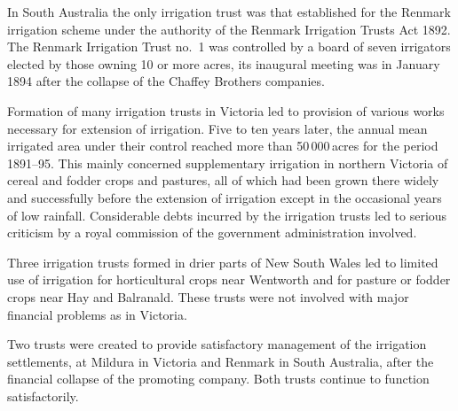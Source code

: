 In South Australia the only irrigation trust was that established for
the Renmark  irrigation scheme under the authority
of the Renmark Irrigation Trusts Act  1892.  The Renmark Irrigation Trust no.~1
 was
controlled by a board of seven irrigators elected by those owning 10
or more acres, its inaugural meeting was in January 1894 after the
collapse of the Chaffey Brothers
companies.

\closure
Formation of many irrigation trusts in Victoria led to provision of
various works necessary for extension of irrigation.  Five to ten
years later, the annual mean irrigated area under their control
reached more than 50\,000\,acres for the period 1891--95.  This mainly
concerned supplementary irrigation in northern Victoria of cereal and
fodder crops and pastures, all of which had been grown there widely
and successfully before the extension of irrigation except in the
occasional years of low rainfall.  Considerable debts incurred by the
irrigation trusts led to serious criticism by a royal commission of
the government administration involved.

Three irrigation trusts formed in drier parts of New South Wales led
to limited use of irrigation for horticultural crops near Wentworth
and for pasture or fodder crops near Hay and Balranald.  These trusts
were not involved with major financial problems as in Victoria.

Two trusts were created to provide satisfactory management of the
irrigation settlements, at Mildura in Victoria and Renmark in South
Australia, after the financial collapse of the promoting company.
Both trusts continue to function satisfactorily.

